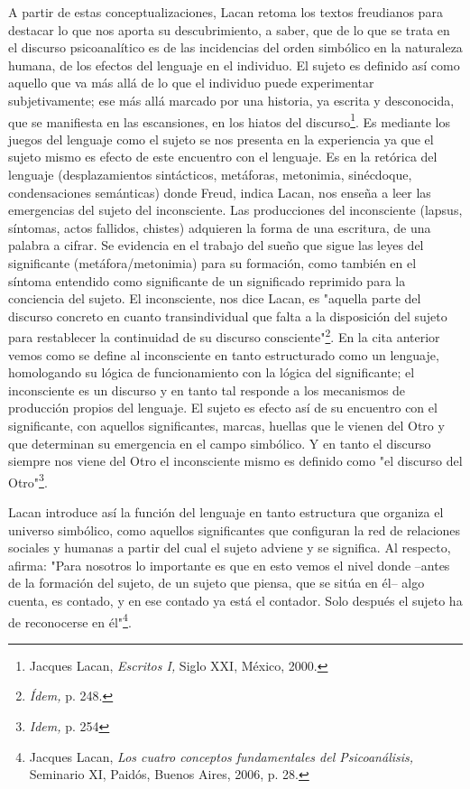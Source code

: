 \documentclass{book}
\begin{document}
A partir de estas conceptualizaciones, Lacan retoma los textos
freudianos para destacar lo que nos aporta su descubrimiento, a saber,
que de lo que se trata en el discurso psicoanalítico es de las
incidencias del orden simbólico en la naturaleza humana, de los efectos
del lenguaje en el individuo. El sujeto es definido así como aquello que
va más allá de lo que el individuo puede experimentar subjetivamente;
ese más allá marcado por una historia, ya escrita y desconocida, que se
manifiesta en las escansiones, en los hiatos del discurso\footnote{Jacques
  Lacan, \emph{Escritos I,} Siglo XXI, México, 2000.}. Es mediante los
juegos del lenguaje como el sujeto se nos presenta en la experiencia ya
que el sujeto mismo es efecto de este encuentro con el lenguaje. Es en
la retórica del lenguaje (desplazamientos sintácticos, metáforas,
metonimia, sinécdoque, condensaciones semánticas) donde Freud, indica
Lacan, nos enseña a leer las emergencias del sujeto del inconsciente.
Las producciones del inconsciente (lapsus, síntomas, actos fallidos,
chistes) adquieren la forma de una escritura, de una palabra a cifrar.
Se evidencia en el trabajo del sueño que sigue las leyes del
significante (metáfora/metonimia) para su formación, como también en el
síntoma entendido como significante de un significado reprimido para la
conciencia del sujeto. El inconsciente, nos dice Lacan, es "aquella
parte del discurso concreto en cuanto transindividual que falta a la
disposición del sujeto para restablecer la continuidad de su discurso
consciente"\footnote{\emph{Ídem,} p. 248.}. En la cita anterior vemos
como se define al inconsciente en tanto estructurado como un lenguaje,
homologando su lógica de funcionamiento con la lógica del significante;
el inconsciente es un discurso y en tanto tal responde a los mecanismos
de producción propios del lenguaje. El sujeto es efecto así de su
encuentro con el significante, con aquellos significantes, marcas,
huellas que le vienen del Otro y que determinan su emergencia en el
campo simbólico. Y en tanto el discurso siempre nos viene del Otro el
inconsciente mismo es definido como "el discurso del Otro"\footnote{\emph{Idem,}
  p. 254}.

Lacan introduce así la función del lenguaje en tanto estructura que
organiza el universo simbólico, como aquellos significantes que
configuran la red de relaciones sociales y humanas a partir del cual el
sujeto adviene y se significa. Al respecto, afirma: "Para nosotros lo
importante es que en esto vemos el nivel donde --antes de la formación
del sujeto, de un sujeto que piensa, que se sitúa en él-- algo cuenta,
es contado, y en ese contado ya está el contador. Solo después el sujeto
ha de reconocerse en él"\footnote{Jacques Lacan, \emph{Los cuatro
  conceptos fundamentales del Psicoanálisis,} Seminario XI, Paidós,
  Buenos Aires, 2006, p. 28.}.
\end{document}
